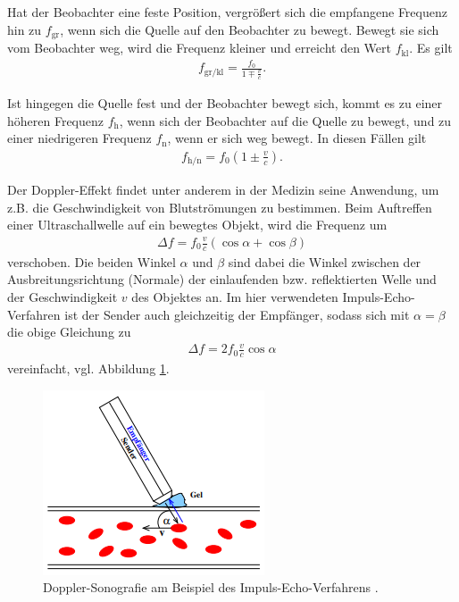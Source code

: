 \noindent
Hat der Beobachter eine feste Position, vergrößert sich die empfangene Frequenz hin zu $f_\text{gr}$,
wenn sich die Quelle auf den Beobachter zu bewegt.
Bewegt sie sich vom Beobachter weg, wird die Frequenz kleiner und erreicht den Wert $f_\text{kl}$.
Es gilt 
\begin{align}
    f_\text{gr/kl} = \frac{f_0}{1\mp \frac{v}{c}}.
    \label{eq:gr_kl}
\end{align}

\noindent
Ist hingegen die Quelle fest und der Beobachter bewegt sich, kommt es zu einer höheren Frequenz $f_\text{h}$, wenn sich der Beobachter
auf die Quelle zu bewegt, und zu einer niedrigeren Frequenz $f_\text{n}$, wenn er sich weg bewegt.
In diesen Fällen gilt
\begin{align}
    f_\text{h/n} = f_0 \left(1\pm \frac{v}{c}\right).
    \label{eq:h_n}
\end{align}

\noindent
Der Doppler-Effekt findet unter anderem in der Medizin seine Anwendung, um z.B. die Geschwindigkeit von Blutströmungen
zu bestimmen.
Beim Auftreffen einer Ultraschallwelle auf ein bewegtes Objekt, wird die Frequenz um 
\begin{align}
    \Delta f = f_0 \frac{v}{c} \left(\cos \alpha + \cos \beta\right)
\end{align}
verschoben.
Die beiden Winkel $\alpha$ und $\beta$ sind dabei die Winkel zwischen der Ausbreitungsrichtung (Normale) der einlaufenden bzw.
reflektierten Welle und der Geschwindigkeit $v$ des Objektes an.
Im hier verwendeten Impuls-Echo-Verfahren ist der Sender auch gleichzeitig der Empfänger, sodass sich mit $\alpha = \beta$
die obige Gleichung zu 
\begin{align}
    \Delta f = 2 f_0 \frac{v}{c} \cos \alpha
    \label{eq:verschiebung}
\end{align}
vereinfacht, vgl. Abbildung \ref{fig:impuls_echo}.

\begin{figure}[H]
    \centering
    \includegraphics[height = 5 cm]{Abbildungen/impuls_echo.png}
    \caption{Doppler-Sonografie am Beispiel des Impuls-Echo-Verfahrens \cite{man:us3}.}
    \label{fig:impuls_echo}
\end{figure}